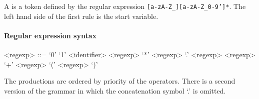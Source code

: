 \documentclass[11pt]{article}
\begin{document}
A  is a token defined by the regular expression
\mbox{\texttt{[a-zA-Z_][a-zA-Z_0-9']*}}. The left hand side of the first rule is the start variable.

\paragraph{Regular expression syntax}
\begin{grammar}
<regexp> ::= `0'
  \alt `1'
  \alt <identifier>
  \alt <regexp> `*'
  \alt <regexp> `.' <regexp>
  \alt <regexp> `+' <regexp>
  \alt `(' <regexp> `)'
\end{grammar}
The productions are ordered by priority of the operators. There is a second version of the grammar in which the concatenation symbol `.' is omitted.

\clearpage


\end{document}
